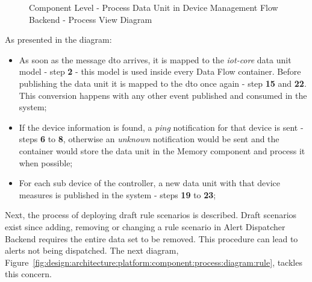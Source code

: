\begin{figure}[H]
   \centering
   \resizebox{\columnwidth}{!}
   {
      
   }
   \caption[Component Level - Process Data Unit in Device Management Flow Backend - Process View Diagram]{Component Level - Process Data Unit in Device Management Flow Backend - Process View Diagram}
   \label{fig:design:architecture:platform:component:process:diagram:device}
\end{figure}

As presented in the diagram:

\begin{itemize}
   \item As soon as the message dto arrives, it is mapped to the \textit{iot-core} data unit model - step \textbf{2} - this model is used inside every Data Flow container. Before publishing the data unit it is mapped to the dto once again - step \textbf{15} and \textbf{22}. This conversion happens with any other event published and consumed in the system;
   \item If the device information is found, a \textit{ping} notification for that device is sent - steps \textbf{6} to \textbf{8}, otherwise an \textit{unknown} notification would be sent and the container would store the data unit in the Memory component and process it when possible;
   \item For each sub device of the controller, a new data unit with that device measures is published in the system - steps \textbf{19} to \textbf{23};
\end{itemize}

Next, the process of deploying draft rule scenarios is described.
Draft scenarios exist since adding, removing or changing a rule scenario in Alert Dispatcher Backend requires the entire data set to be removed. This procedure can lead to alerts not being dispatched. The next diagram, Figure~\ref{fig:design:architecture:platform:component:process:diagram:rule}, tackles this concern.

%       

